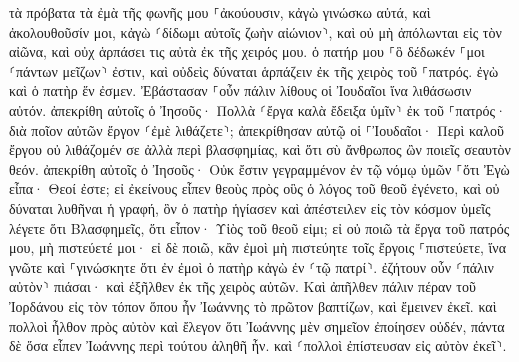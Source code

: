 \documentclass[twoside, 9pt]{extreport}
\begin{document}
τὰ πρόβατα τὰ ἐμὰ τῆς φωνῆς μου ⸀ἀκούουσιν, κἀγὼ γινώσκω αὐτά, καὶ ἀκολουθοῦσίν μοι, 
κἀγὼ ⸂δίδωμι αὐτοῖς ζωὴν αἰώνιον⸃, καὶ οὐ μὴ ἀπόλωνται εἰς τὸν αἰῶνα, καὶ οὐχ ἁρπάσει τις αὐτὰ ἐκ τῆς χειρός μου. 
ὁ πατήρ μου ⸀ὃ δέδωκέν ⸀μοι ⸂πάντων μεῖζων⸃ ἐστιν, καὶ οὐδεὶς δύναται ἁρπάζειν ἐκ τῆς χειρὸς τοῦ ⸀πατρός. 
ἐγὼ καὶ ὁ πατὴρ ἕν ἐσμεν. 
Ἐβάστασαν ⸀οὖν πάλιν λίθους οἱ Ἰουδαῖοι ἵνα λιθάσωσιν αὐτόν. 
ἀπεκρίθη αὐτοῖς ὁ Ἰησοῦς· Πολλὰ ⸂ἔργα καλὰ ἔδειξα ὑμῖν⸃ ἐκ τοῦ ⸀πατρός· διὰ ποῖον αὐτῶν ἔργον ⸂ἐμὲ λιθάζετε⸃; 
ἀπεκρίθησαν αὐτῷ οἱ ⸀Ἰουδαῖοι· Περὶ καλοῦ ἔργου οὐ λιθάζομέν σε ἀλλὰ περὶ βλασφημίας, καὶ ὅτι σὺ ἄνθρωπος ὢν ποιεῖς σεαυτὸν θεόν. 
ἀπεκρίθη αὐτοῖς ὁ Ἰησοῦς· Οὐκ ἔστιν γεγραμμένον ἐν τῷ νόμῳ ὑμῶν ⸀ὅτι Ἐγὼ εἶπα· Θεοί ἐστε; 
εἰ ἐκείνους εἶπεν θεοὺς πρὸς οὓς ὁ λόγος τοῦ θεοῦ ἐγένετο, καὶ οὐ δύναται λυθῆναι ἡ γραφή, 
ὃν ὁ πατὴρ ἡγίασεν καὶ ἀπέστειλεν εἰς τὸν κόσμον ὑμεῖς λέγετε ὅτι Βλασφημεῖς, ὅτι εἶπον· Υἱὸς τοῦ θεοῦ εἰμι; 
εἰ οὐ ποιῶ τὰ ἔργα τοῦ πατρός μου, μὴ πιστεύετέ μοι· 
εἰ δὲ ποιῶ, κἂν ἐμοὶ μὴ πιστεύητε τοῖς ἔργοις ⸀πιστεύετε, ἵνα γνῶτε καὶ ⸀γινώσκητε ὅτι ἐν ἐμοὶ ὁ πατὴρ κἀγὼ ἐν ⸂τῷ πατρί⸃. 
ἐζήτουν οὖν ⸂πάλιν αὐτὸν⸃ πιάσαι· καὶ ἐξῆλθεν ἐκ τῆς χειρὸς αὐτῶν. 
Καὶ ἀπῆλθεν πάλιν πέραν τοῦ Ἰορδάνου εἰς τὸν τόπον ὅπου ἦν Ἰωάννης τὸ πρῶτον βαπτίζων, καὶ ἔμεινεν ἐκεῖ. 
καὶ πολλοὶ ἦλθον πρὸς αὐτὸν καὶ ἔλεγον ὅτι Ἰωάννης μὲν σημεῖον ἐποίησεν οὐδέν, πάντα δὲ ὅσα εἶπεν Ἰωάννης περὶ τούτου ἀληθῆ ἦν. 
καὶ ⸂πολλοὶ ἐπίστευσαν εἰς αὐτὸν ἐκεῖ⸃. 
\end{document}
